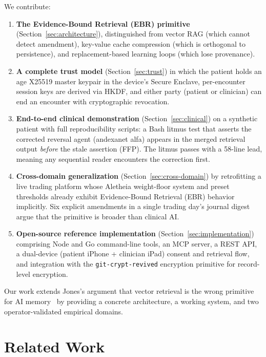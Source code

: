 \documentclass[runningheads]{llncs}
\begin{document}
We contribute:
\begin{enumerate}
  \item \textbf{The Evidence-Bound Retrieval (EBR) primitive}
        (Section~\ref{sec:architecture}), distinguished from vector RAG
        (which cannot detect amendment), key-value cache compression
        (which is orthogonal to persistence), and replacement-based learning
        loops (which lose provenance).
  \item \textbf{A complete trust model}
        (Section~\ref{sec:trust}) in which the patient holds an age X25519
        master keypair in the device's Secure Enclave, per-encounter session
        keys are derived via HKDF, and either party (patient or clinician)
        can end an encounter with cryptographic revocation.
  \item \textbf{End-to-end clinical demonstration}
        (Section~\ref{sec:clinical}) on a synthetic patient with full
        reproducibility scripts: a Bash litmus test that asserts the
        corrected reversal agent (andexanet alfa) appears in the merged
        retrieval output \emph{before} the stale assertion (FFP). The litmus
        passes with a 58-line lead, meaning any sequential reader encounters
        the correction first.
  \item \textbf{Cross-domain generalization}
        (Section~\ref{sec:cross-domain}) by retrofitting a live trading
        platform whose Aletheia weight-floor system and preset thresholds
        already exhibit Evidence-Bound Retrieval (EBR) behavior implicitly. Six
        explicit amendments in a single trading day's journal digest
        argue that the primitive is broader than clinical AI.
  \item \textbf{Open-source reference implementation}
        (Section~\ref{sec:implementation}) comprising Node and Go command-line
        tools, an MCP server, a REST API, a dual-device (patient iPhone +
        clinician iPad) consent and retrieval flow, and integration with
        the \texttt{git-crypt-revived} encryption primitive for record-level
        encryption.
\end{enumerate}

Our work extends Jones's argument that vector retrieval is the wrong
primitive for AI memory~\cite{jones2026rag} by providing a concrete
architecture, a working system, and two operator-validated empirical domains.

\section{Related Work}
\label{sec:related}
\end{document}
